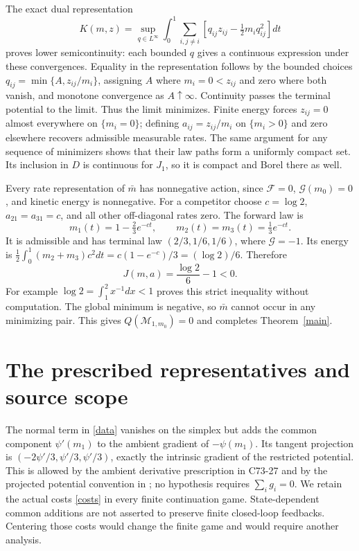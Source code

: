 \documentclass[11pt,a4paper]{article}
\begin{document}
The exact dual representation
\[
 K(m,z)=\sup_{q\in L^\infty}\int_0^1\sum_{i,j\ne i}
 [q_{ij}z_{ij}-\tfrac12m_iq_{ij}^2]dt
\]
proves lower semicontinuity: each bounded $q$ gives a continuous
expression under these convergences. Equality in the representation
follows by the bounded choices $q_{ij}=\min\{A,z_{ij}/m_i\}$,
assigning $A$ where $m_i=0<z_{ij}$ and zero where both vanish, and
monotone convergence as $A\uparrow\infty$. Continuity passes the
terminal potential to the limit. Thus the limit minimizes. Finite
energy forces $z_{ij}=0$ almost everywhere on $\{m_i=0\}$; defining
$a_{ij}=z_{ij}/m_i$ on $\{m_i>0\}$ and zero elsewhere recovers
admissible measurable rates. The same argument for any sequence of
minimizers shows that their law paths form a uniformly compact set.
Its inclusion in $D$ is continuous for $J_1$, so it is compact and
Borel there as well.

Every rate representation of $\bar m$ has nonnegative action, since
$\mathcal F=0$, $\mathcal G(m_0)=0$, and kinetic energy is nonnegative.
For a competitor choose $c=\log2$, $a_{21}=a_{31}=c$, and all other
off-diagonal rates zero. The forward law is
\[
 m_1(t)=1-\tfrac23e^{-ct},\qquad
 m_2(t)=m_3(t)=\tfrac13e^{-ct}.
\]
It is admissible and has terminal law $(2/3,1/6,1/6)$, where
$\mathcal G=-1$. Its energy is
$\frac12\int_0^1(m_2+m_3)c^2dt=c(1-e^{-c})/3=(\log2)/6$.
Therefore
\begin{equation}\label{strict}
 J(m,a)=\frac{\log2}{6}-1<0.
\end{equation}
For example $\log2=\int_1^2x^{-1}dx<1$ proves this strict inequality
without computation. The global minimum is negative, so $\bar m$
cannot occur in any minimizing pair. This gives
$Q(\mathcal M_{1,m_0})=0$ and completes Theorem~\ref{main}.

\section{The prescribed representatives and source scope}
The normal term in \eqref{data} vanishes on the simplex but adds the
common component $\psi'(m_1)$ to the ambient gradient of $-\psi(m_1)$.
Its tangent projection is $(-2\psi'/3,\psi'/3,\psi'/3)$, exactly the
intrinsic gradient of the restricted potential. This is allowed by
the ambient derivative prescription in C73-27 and by the projected
potential convention in \cite[Eq.~(2.9)]{CeD}; no hypothesis requires
$\sum_i g_i=0$. We retain the actual costs \eqref{costs} in every
finite continuation game. State-dependent common additions are not
asserted to preserve finite closed-loop feedbacks. Centering those
costs would change the finite game and would require another analysis.
\end{document}
